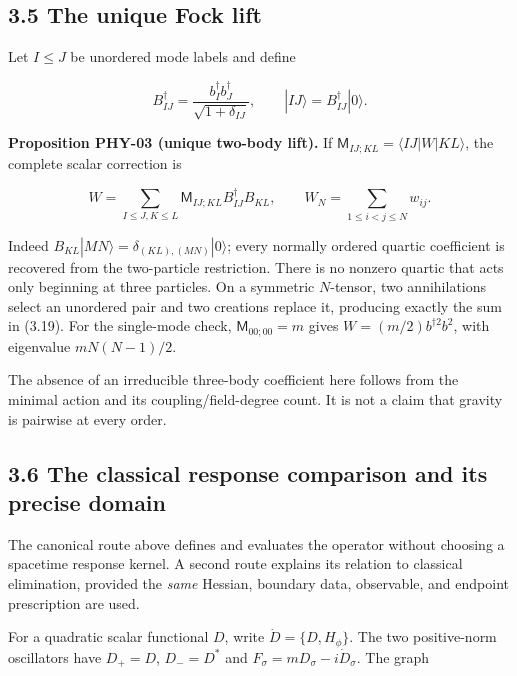 \documentclass[a4paper,11pt]{article}
\numberwithin{equation}{section}
\begin{document}
\hypertarget{the-unique-fock-lift}{%
\subsection{3.5 The unique Fock lift}\label{the-unique-fock-lift}}

Let \(I\le J\) be unordered mode labels and define

\[
B^\dagger_{IJ}=\frac{b_I^\dagger b_J^\dagger}{\sqrt{1+\delta_{IJ}}},
\qquad |IJ\rangle=B^\dagger_{IJ}|0\rangle .
\]

\textbf{Proposition PHY-03 (unique two-body lift).} If \(\mathsf M_{IJ;KL}=\langle IJ|W|KL\rangle\), the complete scalar correction is

\[
\boxed{
W=\sum_{I\le J,K\le L}
\mathsf M_{IJ;KL}B^\dagger_{IJ}B_{KL},
\qquad
W_N=\sum_{1\le i<j\le N}w_{ij}.
}
\tag{3.19}
\]

Indeed \(B_{KL}|MN\rangle=\delta_{(KL),(MN)}|0\rangle\); every normally ordered quartic coefficient is recovered from the two-particle restriction. There is no nonzero quartic that acts only beginning at three particles. On a symmetric \(N\)-tensor, two annihilations select an unordered pair and two creations replace it, producing exactly the sum in (3.19). For the single-mode check, \(\mathsf M_{00;00}=m\) gives \(W=(m/2)b^{\dagger2}b^2\), with eigenvalue \(mN(N-1)/2\).

The absence of an irreducible three-body coefficient here follows from the minimal action and its coupling/field-degree count. It is not a claim that gravity is pairwise at every order.

\hypertarget{the-classical-response-comparison-and-its-precise-domain}{%
\subsection{3.6 The classical response comparison and its precise domain}\label{the-classical-response-comparison-and-its-precise-domain}}

The canonical route above defines and evaluates the operator without choosing a spacetime response kernel. A second route explains its relation to classical elimination, provided the \emph{same} Hessian, boundary data, observable, and endpoint prescription are used.

For a quadratic scalar functional \(D\), write \(\dot D=\{D,H_\phi\}\). The two positive-norm oscillators have \(D_+=D\), \(D_-=D^*\) and \(F_\sigma=mD_\sigma-i\dot D_\sigma\). The graph
\end{document}
